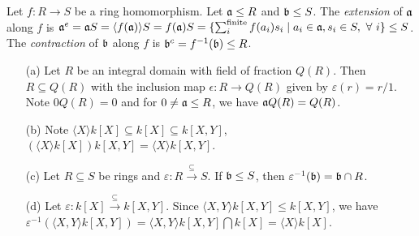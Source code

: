 \begin{definition}
    Let $f: R \to S$ be a ring homomorphism. Let $\mathfrak{a} \leq R$ and $\mathfrak{b} \leq S$. The \emph{extension} of $\mathfrak{a}$ along $f$ is $\mathfrak{a}^e = \mathfrak{a} S = \langle f(\mathfrak{a}) \rangle S  = f(\mathfrak{a})S = \{\sum_i^{\text{finite}} f(a_i)s_i \mid a_i \in \mathfrak{a}, s_i \in S,\ \forall \  i\} \leq S$. The \emph{contraction} of $\mathfrak{b}$ along $f$ is $\mathfrak{b}^c = f^{-1}(\mathfrak{b}) \leq R$.
\end{definition}

\begin{example}
    \begin{enumerate}
        \item[(a)] Let $R$ be an integral domain with field of fraction $Q(R)$. Then $R \subseteq Q(R)$ with the inclusion map $\epsilon:R \to Q(R)$ given by $\varepsilon(r) = r/1$. Note $0Q(R) = 0$ and for $0 \neq \mathfrak{a} \leq R$, we have $\mathfrak{a} Q(R) = Q(R)$.
        \item[(b)] Note $\langle X\rangle k[X] \subseteq k[X] \subseteq k[X,Y]$, $\left(\langle X \rangle k[X]\right)k[X,Y] = \langle X \rangle k[X,Y]$.
        \item[(c)] Let $R \subseteq S$ be rings and $\varepsilon: R \xrightarrow \subseteq S$. If $\mathfrak{b} \leq S$, then $\varepsilon^{-1}(\mathfrak{b}) = \mathfrak{b} \cap R$.
        \item[(d)] Let $\varepsilon : k[X] \xrightarrow{\subseteq} k[X,Y]$. Since $\langle X,Y \rangle k[X,Y] \leq k[X,Y]$, we have $\varepsilon^{-1}(\langle X,Y \rangle k[X,Y]) = \langle X,Y \rangle k[X,Y] \textstyle \bigcap k[X] = \langle X \rangle k[X]$.
    \end{enumerate}
\end{example}

